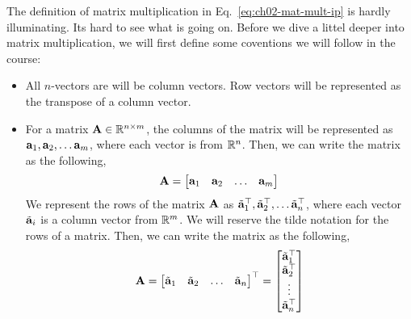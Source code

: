 The definition of matrix multiplication in Eq.~\ref{eq:ch02-mat-mult-ip} is hardly illuminating. Its hard to see what is going on. Before we dive a littel deeper into matrix multiplication, we will first define some coventions we will follow in the course:
\begin{itemize}
    \item All $n$-vectors are will be column vectors. Row vectors will be represented as the transpose of a column vector.
    \item For a matrix $\mathbf{A} \in \mathbb{R}^{n \times m}$, the columns of the matrix will be represented as $\mathbf{a}_1, \mathbf{a}_2, \ldots \mathbf{a}_m$, where each vector is from $\mathbb{R}^n$. Then, we can write the matrix as the following,
    \begin{equation}
        \mf{A} = \bmxc \mf{a}_1 & \mf{a}_2 & \ldots & \mf{a}_m \emx
        \label{eq:ch02-mat-col-rep}
    \end{equation}
    We represent the rows of the matrix $\mathbf{A}$ as $\tilde{\mathbf{a}}^\top_1, \tilde{\mathbf{a}}^\top_2, \ldots \tilde{\mathbf{a}}^\top_n$, where each vector $\tilde{\mathbf{a}}_i$ is a column vector from $\mathbb{R}^m$. We will reserve the tilde notation for the rows of a matrix. Then, we can write the matrix as the following,
    \begin{equation}
        \mf{A} = \bmxc \tilde{\mf{a}}_1 & \tilde{\mf{a}}_2 & \ldots & \tilde{\mf{a}}_n \emx^\top = \bmxc \tilde{\mf{a}}_1^\top \\ \tilde{\mf{a}}_2^\top \\ \vdots \\ \tilde{\mf{a}}_n^\top \emx
        \label{eq:ch02-mat-row-rep}
    \end{equation}
\end{itemize}

